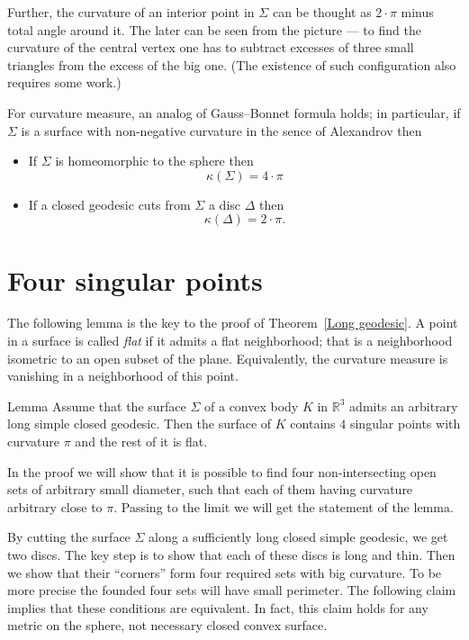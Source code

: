 \documentclass[oneside,a4paper, 12pt]{article}
\begin{document}
Further, the curvature of an interior point in $\Sigma$ can be thought as $2{\cdot}\pi$ minus total angle around it.
The later can be seen from the picture ---
to find the curvature of the central vertex one has to subtract excesses of three small triangles from the excess of the big one.
(The existence of such configuration also requires some work.)

For curvature measure, an analog of Gauss--Bonnet formula holds;
in particular, if $\Sigma$ is a surface with non-negative curvature in the sence of Alexandrov then
\begin{itemize}
\item If $\Sigma$ is homeomorphic to the sphere then 
\[\kappa(\Sigma)=4\cdot\pi\]
\item If a closed geodesic cuts from $\Sigma$ a disc $\Delta$ then 
\[\kappa(\Delta)=2\cdot\pi.\]
\end{itemize}


\section{Four singular points}

The following lemma is the key to the proof of Theorem~\ref{Long geodesic}.
A point in a surface is called \emph{flat} if it admits a flat neighborhood;
that is a neighborhood isometric to an open subset of the plane.
Equivalently, the curvature measure is vanishing in a neighborhood of this point.

\begin{thm}{Lemma} 
	\label{lem:4 singular points}
Assume that the surface $\Sigma$ of a convex body $K$ in $\mathbb{R}^3$
admits an arbitrary long simple closed geodesic.
Then the surface of $K$ contains $4$ singular points with curvature $\pi$ and the rest of it is flat.
\end{thm}

In the proof we will show that 
it is possible to find four non-intersecting open sets of arbitrary small diameter, 
such that each of them having curvature arbitrary close to $\pi$.
Passing to the limit we will get the statement of the lemma.

By cutting the surface $\Sigma$ along a sufficiently long closed simple geodesic,
we get two discs.
The key step is to show that each of these discs is long and thin.
Then we show that their ``corners'' form four required sets with big curvature.
To be more precise the founded four sets will have small perimeter.
The following claim implies that these conditions are equivalent.
In fact, this claim holds for any metric on the sphere, not necessary closed convex surface.
\end{document}
